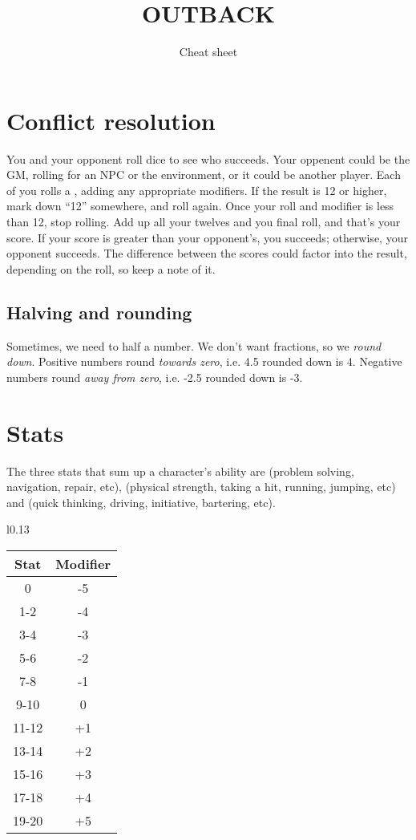 \documentclass[10pt, a4paper, twocolumn]{article}
\title{\uppercase{Outback}}
\subtitle{Cheat sheet}
\date{}
\begin{document}
\maketitle

\section{Conflict resolution}
You and your opponent roll dice to see who succeeds. Your oppenent could be the
GM, rolling for an NPC or the environment, or it could be another player. Each
of you rolls a , adding any appropriate modifiers. If the result is 12
or higher, mark down ``12'' somewhere, and roll again. Once your roll and
modifier is less than 12, stop rolling. Add up all your twelves and you final
roll, and that's your score. If your score is greater than your
opponent's, you succeeds; otherwise, your opponent succeeds. The difference
between the scores could factor into the result, depending on the roll, so keep
a note of it.

\subsection{Halving and rounding}
Sometimes, we need to half a number. We don't want fractions, so we
\emph{round down}. Positive numbers round \emph{towards zero}, i.e. 4.5
rounded down is 4. Negative numbers round \emph{away from zero}, i.e. -2.5
rounded down is -3.

\section{Stats}
The three stats that sum up a character's ability are  (problem
solving, navigation, repair,  etc),  (physical strength, taking a
hit, running, jumping, etc) and  (quick thinking, driving,
initiative, bartering, etc).

\begin{wraptable}[12]{l}{0.13\textwidth}
\vspace*{-3ex}
\begin{tabular}{cc}
  Stat  & Modifier \\
  \hline 
  0     & -5       \\
  1-2   & -4       \\
  3-4   & -3       \\
  5-6   & -2       \\
  7-8   & -1       \\
  9-10  &  0       \\
  11-12 & +1       \\
  13-14 & +2       \\
  15-16 & +3       \\
  17-18 & +4       \\
  19-20 & +5
\end{tabular}
\vspace*{-10pt}
\end{wraptable}
\end{document}
